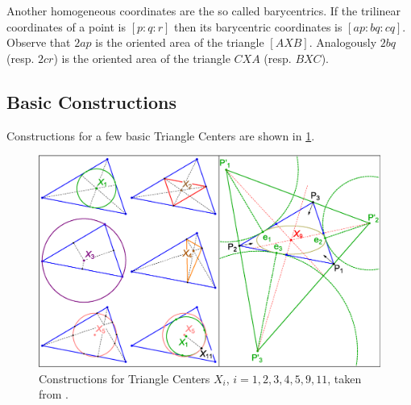\begin{remark} \label{rem:baricentro_coord}
Another homogeneous coordinates are the so called {barycentrics}. If the   trilinear coordinates of a point is $[p:q:r]$  then its barycentric coordinates is $[ap:bq:cq]$. Observe that $2ap$ is the oriented area of the triangle $[AXB]$. Analogously $2bq$ (resp. $2cr$) is the oriented area of the triangle $CXA$ (resp. $BXC$).
\end{remark}

\subsection*{Basic Constructions}

Constructions for a few basic Triangle Centers are shown in \cref{fig:constructions}.

\begin{figure}[H]
    \centering
   \includegraphics[width=\textwidth]{zappA/pics/pics_appA_010_constr.eps}
    \caption{Constructions for Triangle Centers $X_i$, $i=1,2,3,4,5,9,11$, taken from \cite{reznik2020-intelligencer}.}
    \label{fig:constructions}
\end{figure}

